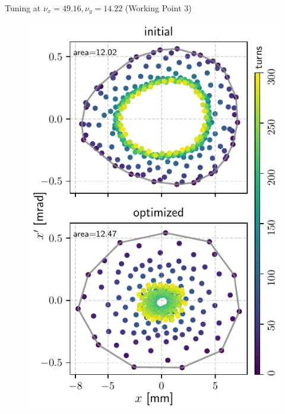 \documentclass[aspectratio=169]{beamer}
\begin{document}
\begin{frame}{Tuning at $\nu_x = 49.16, \nu_y = 14.22$ (Working Point 3)}
\begin{minipage}{0.44\textwidth}
\begin{figure}
            \includegraphics[height=0.9\textheight]{wp3_phase_space.pdf}
        \end{figure}
    \end{minipage}
\end{frame}
\end{document}
